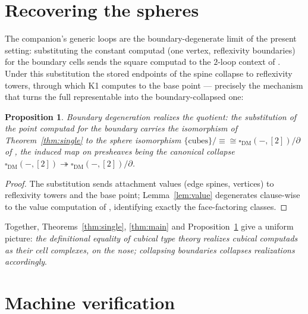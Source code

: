 \documentclass[11pt]{amsart}
\newtheorem{prop}[thm]{Proposition}
\theoremstyle{definition}
\newcommand{\Dbox}{\square_{\mathrm{DM}}}
\newcommand{\aconv}{\equiv}
\begin{document}
\section{Recovering the spheres}
\label{sec:spheres}

The companion's generic loops are the boundary-degenerate limit of
the present setting: substituting the constant computad (one
vertex, reflexivity boundaries) for the boundary cells sends the
square computad to the $2$-loop context of \cite{Sphere}.  Under
this substitution the stored endpoints of the spine collapse to
reflexivity towers, through which K1 computes to the base point ---
precisely the mechanism that turns the full representable into the
boundary-collapsed one:

\begin{prop}\label{prop:spheres}
  Boundary degeneration realizes the quotient: the substitution of
  the point computad for the boundary carries the isomorphism of
  Theorem~\ref{thm:single} to the sphere isomorphism
  $\{\text{cubes}\}/{\aconv} \cong \Dbox(-,[2])/\partial$ of
  \cite{Sphere}, the induced map on presheaves being the canonical
  collapse $\Dbox(-,[2]) \twoheadrightarrow
  \Dbox(-,[2])/\partial$.
\end{prop}
\begin{proof}
  The substitution sends attachment values (edge spines, vertices)
  to reflexivity towers and the base point; Lemma~\ref{lem:value}
  degenerates clause-wise to the value computation of
  \cite[Lemma 5.1]{Sphere}, identifying exactly the face-factoring
  classes.
\end{proof}

Together, Theorems~\ref{thm:single}, \ref{thm:main} and
Proposition~\ref{prop:spheres} give a uniform picture: \emph{the
definitional equality of cubical type theory realizes cubical
computads as their cell complexes, on the nose; collapsing
boundaries collapses realizations accordingly}.

\section{Machine verification}
\label{sec:artifact}
\end{document}
